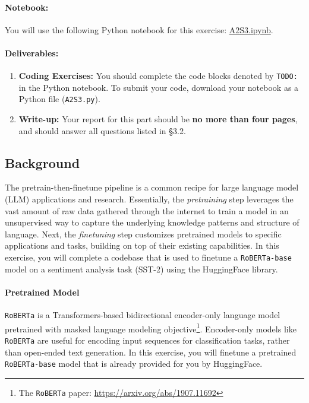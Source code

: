 \documentclass{article}
\newcommand{\sst}{SST-2\xspace}
\newcommand{\modelthree}{RoBERTa-base\xspace}
\begin{document}
\paragraph{Notebook:}
You will use the following Python notebook for this exercise:
\textcolor{blue}{\href{https://colab.research.google.com/drive/13oBf6_e6xc9W9uJIxjndX1z-SwPRysRw?usp=sharing}{A2S3.ipynb}}.

\paragraph{Deliverables:} 

\begin{enumerate}
\item \textbf{Coding Exercises:} You should complete the code blocks denoted by
\texttt{TODO:} in the Python notebook. To submit your code, download your
notebook as a Python file (\verb|A2S3.py|).
\item \textbf{Write-up:} Your report for this part should be \textbf{no more
than four pages}, and should answer all questions listed in \S 3.2. 
\end{enumerate}

\subsection{Background}

The pretrain-then-finetune pipeline is a common recipe for large language model
(LLM) applications and research. Essentially, the \textit{pretraining} step
leverages the vast amount of raw data gathered through the internet to train a
model in an unsupervised way to capture the underlying knowledge patterns and
structure of language. Next, the \textit{finetuning} step customizes pretrained
models to specific applications and tasks, building on top of their existing
capabilities. In this exercise, you will complete a codebase that is used to
finetune a \texttt{\modelthree} model on a sentiment analysis task (\sst) using
the HuggingFace library. 

\paragraph{Pretrained Model}

\texttt{RoBERTa} is a Transformers-based bidirectional encoder-only language
model pretrained with masked language modeling objective\footnote{The
\texttt{RoBERTa} paper: \url{https://arxiv.org/abs/1907.11692}}. Encoder-only
models like \texttt{RoBERTa} are useful for encoding input sequences for
classification tasks, rather than open-ended text generation. In this exercise,
you will finetune a pretrained \texttt{\modelthree} model that is already
provided for you by HuggingFace.
\end{document}
